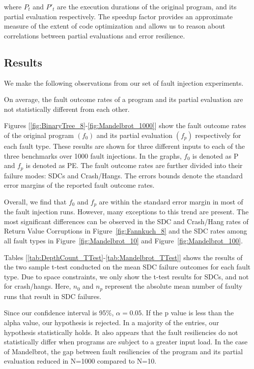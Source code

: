 where $P_t$ and $P'_t$ are the execution durations of the original program, and its partial evaluation respectively.
The speedup factor provides an approximate measure of the extent of code optimization and allows us to reason about correlations between partial evaluations and error resilience.


\subsection{Results}
\label{sec:results}

We make the following observations from our set of fault injection experiments.

\begin{obs}
  \label{obs:faultoutcomes}
  On average, the fault outcome rates of a program and its partial evaluation are not statistically different from each other.
\end{obs}

Figures [\ref{fig:BinaryTree_8}-\ref{fig:Mandelbrot_1000}] show the fault outcome rates of the original program $(f_0)$ and its partial evaluation $(f_p)$ respectively for each fault type.
These results are shown for three different inputs to each of the three benchmarks over 1000 fault injections.  
In the graphs, $f_0$ is denoted as P and $f_p$ is denoted as PE.
The fault outcome rates are further divided into their failure modes: SDCs and Crash/Hangs.
The errors bounds denote the standard error margins of the reported fault outcome rates.

Overall, we find that $f_0$ and $f_p$ are within the standard error margin in most of the fault injection runs.
However, many exceptions to this trend are present.
The most significant differences can be observed in the SDC and Crash/Hang rates of Return Value Corruptions in Figure~\ref{fig:Fannkuch_8} and the SDC rates among all fault types in Figure~\ref{fig:Mandelbrot_10} and Figure~\ref{fig:Mandelbrot_100}.

Tables [\ref{tab:DepthCount_TTest}-\ref{tab:Mandelbrot_TTest}] shows the results of the two sample t-test conducted on the mean SDC failure outcomes for each fault type.
Due to space constraints, we only show the t-test results for SDCs, and not for crash/hangs.
Here, $n_0$ and $n_p$ represent the absolute mean number of faulty runs that result in SDC failures. 

Since our confidence interval is 95\%, $\alpha=0.05$.
If the p value is less than the alpha value, our hypothesis is rejected.
In a majority of the entries, our hypothesis statistically holds.
It also appears that the fault resiliencies do not statistically differ when programs are subject to a greater input load.
In the case of Mandelbrot, the gap between fault resiliencies of the program and its partial evaluation reduced in N=1000 compared to N=10.

